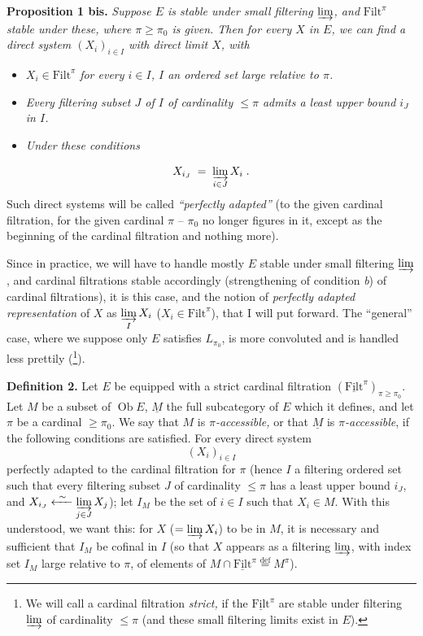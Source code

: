 \documentclass[11pt]{article}
\newcommand{\printedpage}[1]{\marginpar{\footnotesize p.~#1}}
\newcommand{\msp}[1]{\marginpar{\footnotesize [#1]}}
\newcommand{\Filt}{\mathrm{Filt}}
\newcommand{\Ob}{\operatorname{Ob}}
\begin{document}
\textbf{Proposition 1 bis.} \textit{Suppose $E$ is stable under small filtering $\varinjlim$, and} $\Filt^\pi$ \textit{stable under these, where $\pi\ge\pi_0$ is given. Then for every $X$ in $E$, we can find a direct system $(X_i)_{i\in I}$ with direct limit $X$, with}

\begin{itemize}
\item[a)] $X_i\in\Filt^\pi$ \textit{for every $i\in I$, $I$ an ordered set large relative to $\pi$.}
\item[b)] \textit{Every filtering subset $J$ of $I$ of cardinality $\le\pi$ admits a least upper bound $i_J$ in $I$.}
\item[c)] \textit{Under these conditions}
\end{itemize}

\printedpage{47}
\msp{page 86}
\[
X_{i_J} \;=\; \varinjlim_{i\in J} X_i \;.
\]
Such direct systems will be called \textit{``perfectly adapted''} (to the given cardinal filtration, for the given cardinal $\pi$ – $\pi_0$ no longer figures in it, except as the beginning of the cardinal filtration and nothing more).

Since in practice, we will have to handle mostly $E$ stable under small filtering $\varinjlim$, and cardinal filtrations stable accordingly (strengthening of condition \textit{b}) of cardinal filtrations), it is this case, and the notion of \textit{perfectly adapted representation} of $X$ as $\varinjlim\limits_{I} X_i$ ($X_i\in\Filt^\pi$), that I will put forward. The ``general'' case, where we suppose only $E$ satisfies $L_{\pi_0}$, is more convoluted and is handled less prettily (\footnote[41]{We will call a cardinal filtration \textit{strict,} if the $\underline{\Filt}^\pi$ are stable under filtering $\varinjlim$ of cardinality $\le\pi$ (and these small filtering limits exist in $E$).}).

\textbf{Definition 2.} Let $E$ be equipped with a strict cardinal filtration $(\underline{\Filt}^\pi)_{\pi\ge\pi_0}$. Let $M$ be a subset of $\Ob E$, $\underline{M}$ the full subcategory of $E$ which it defines, and let $\pi$ be a cardinal $\ge\pi_0$. We say that $M$ is \textit{$\pi$-accessible,} or that $\underline{M}$ is \textit{$\pi$-accessible}, %
\msp{page 87}
if the following conditions are satisfied. For every direct system
\[
(X_i)_{i\in I}
\]
perfectly adapted to the cardinal filtration for $\pi$ (hence $I$ a filtering ordered set such that every filtering subset $J$ of cardinality $\le\pi$ has a least upper bound $i_J$, and $X_{i_J}\xleftarrow{\ \sim\ }\varinjlim\limits_{j\in J} X_j$); let $I_M$ be the set of $i\in I$ such that $X_i\in M$. With this understood, we want this: for $X$ ($=\varinjlim X_i$) to be in $M$, it is necessary and sufficient that $I_M$ be cofinal in $I$ (so that $X$ appears as a filtering $\varinjlim$, with index set $I_M$ large relative to $\pi$, of elements of $M\cap\underline{\Filt}^\pi\overset{\text{def}}{=}M^\pi$).
\end{document}
